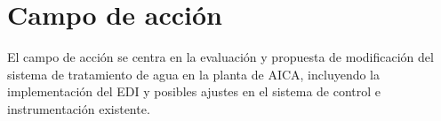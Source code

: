 \section*{Campo de acción}
El campo de acción se centra en la evaluación y propuesta de modificación del sistema de tratamiento de agua en la planta de AICA, incluyendo la implementación del EDI y posibles ajustes en el sistema de control e instrumentación existente.\\